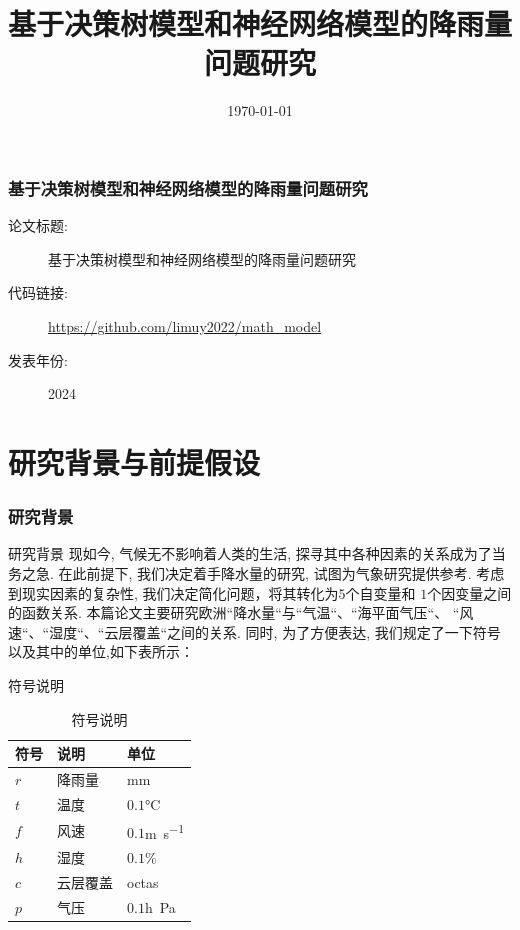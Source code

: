 \documentclass[10pt]{beamer}
\title[]{ {\Large 基于决策树模型和神经网络模型的降雨量问题研究 }}
\institute[VFU] {}
\date{\today} %
\begin{document}
{
\frame{\titlepage}
}





\begin{frame}
	\frametitle{基于决策树模型和神经网络模型的降雨量问题研究}


	\begin{description}
		\item[论文标题:]  基于决策树模型和神经网络模型的降雨量问题研究
		\item[代码链接:]   \url{https://github.com/limuy2022/math_model}
		\item[发表年份:]   2024
	\end{description}

\end{frame}

\section{研究背景与前提假设}
\begin{frame}
	\frametitle{研究背景}
	\begin{block}{研究背景}
		现如今, 气候无不影响着人类的生活, 探寻其中各种因素的关系成为了当务之急.
		在此前提下, 我们决定着手降水量的研究, 试图为气象研究提供参考.
		考虑到现实因素的复杂性, 我们决定简化问题，将其转化为$5$个自变量和
		$1$个因变量之间的函数关系.
		本篇论文主要研究欧洲``降水量``与``气温``、``海平面气压``、 ``风
		速``、``湿度``、``云层覆盖``之间的关系.
		同时, 为了方便表达, 我们规定了一下符号以及其中的单位,如下表所示：
	\end{block}
	\begin{block}{符号说明}
		\begin{table}[h!]
			\centering
			\caption{符号说明}
			\begin{tabular}{p{6em}p{6em}l}
				\hline
				符号  & 说明   & 单位                          \\
				\hline
				$r$ & 降雨量  & \si{\milli\meter}           \\
				$t$ & 温度   & $0.1$\si{\degreeCelsius}    \\
				$f$ & 风速   & $0.1$\si{\meter\per\second} \\
				$h$ & 湿度   & $0.1\%$                     \\
				$c$ & 云层覆盖 & \si{octas}                  \\
				$p$ & 气压   & $0.1$\si{h\pascal}          \\
				\hline
			\end{tabular}
		\end{table}
	\end{block}
\end{frame}
\end{document}
